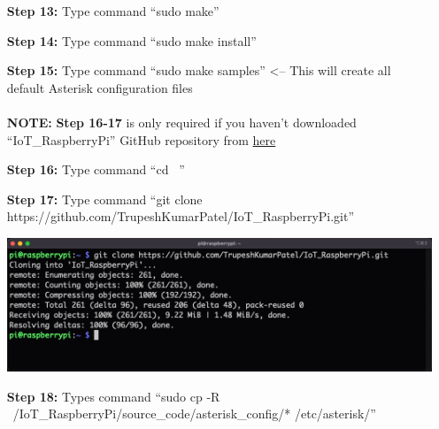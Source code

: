 \begin{itemize}[leftmargin=1.7cm]
			\item[\textbf{Step 13:}] Type command ``sudo make''
			\item[\textbf{Step 14:}] Type command ``sudo make install''
			\item[\textbf{Step 15:}] Type command ``sudo make samples'' <-- This will create all default Asterisk configuration files\\\\
			\danger\textbf{NOTE:} \textbf{Step 16-17} is only required if you haven't downloaded ``IoT\_RaspberryPi'' GitHub repository from \href{https://github.com/TrupeshKumarPatel/IoT_RaspberryPi}{here}  \danger\\
			\item[\textbf{Step 16\danger:}] Type command ``cd ~''
			\item[\textbf{Step 17\danger:}] Type command ``git clone https://github.com/TrupeshKumarPatel/IoT\_RaspberryPi.git''\\
				\begin{minipage}{\textwidth}
					\vspace{2mm}
					\includegraphics[scale=0.35]{Images/raspberry_pi/eduroam_config/clone_git.png}
					\vspace{2mm}
				\end{minipage}
			\item[\textbf{Step 18:}] Types command ``sudo cp -R ~/IoT\_RaspberryPi/source\_code/asterisk\_config/* /etc/asterisk/''
		\end{itemize}